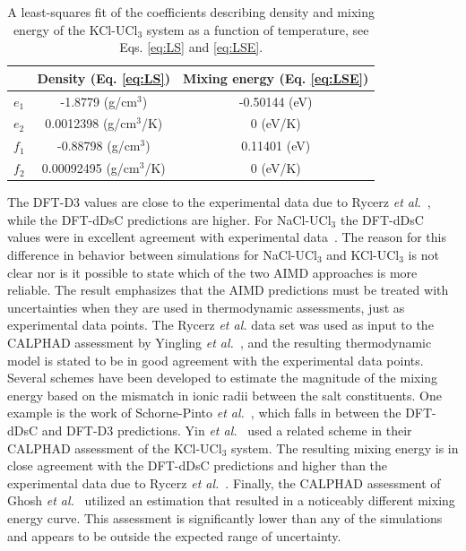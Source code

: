 \documentclass[preprint,3p,10pt,twocolumn,number,sort&compress]{elsarticle}
\begin{document}
\begin{table}[hb!]
\centering
\small
\begin{tabular}{lcc}
\hline
\hline
&Density (Eq. \ref{eq:LS}) &Mixing energy (Eq. \ref{eq:LSE}) \\
\hline
$e_1$ &-1.8779 (g/cm$^3$) &-0.50144 (eV) \\
$e_2$ &0.0012398 (g/cm$^3$/K) &0 (eV/K)\\
$f_1$ &-0.88798 (g/cm$^3$) &0.11401 (eV) \\
$f_2$ &0.00092495 (g/cm$^3$/K) &0 (eV/K)\\
\hline
\hline
\end{tabular}
\caption{A least-squares fit of the coefficients describing density and mixing energy of the KCl-UCl$_3$ system as a function of temperature, see Eqs. \ref{eq:LS} and \ref{eq:LSE}.}
\label{table:LS}
\end{table}

The DFT-D3 values are close to the experimental data due to Rycerz \textit{et al.}~\cite{Rycerz}, while the DFT-dDsC predictions are higher. For NaCl-UCl$_3$ the DFT-dDsC values were in excellent agreement with experimental data~\cite{Andersson}. The reason for this difference in behavior between simulations for NaCl-UCl$_3$ and KCl-UCl$_3$ is not clear nor is it possible to state which of the two AIMD approaches is more reliable. The result emphasizes that the AIMD predictions must be treated with uncertainties when they are used in thermodynamic assessments, just as experimental data points. 
The Rycerz \textit{et al.} data set was used as input to the CALPHAD assessment by Yingling \textit{et al.}~\cite{Yingling}, and the resulting thermodynamic model is stated to be in good agreement with the experimental data points.
Several schemes have been developed to estimate the magnitude of the mixing energy based on the mismatch in ionic radii between the salt constituents. One example is the work of Schorne-Pinto \textit{et al.}~\cite{Pinto}, which falls in between the DFT-dDsC and DFT-D3 predictions.
Yin \textit{et al.}~\cite{YIN2020} used a related scheme in their CALPHAD assessment of the KCl-UCl$_3$ system. The resulting mixing energy is in close agreement with the DFT-dDsC predictions and higher than the experimental data due to Rycerz \textit{et al.}~\cite{Rycerz}. Finally, the CALPHAD assessment of Ghosh \textit{et al.}~\cite{Ghosh} utilized an estimation that resulted in a noticeably different mixing energy curve. This assessment is significantly lower than any of the simulations and appears to be outside the expected range of uncertainty. 
\end{document}
